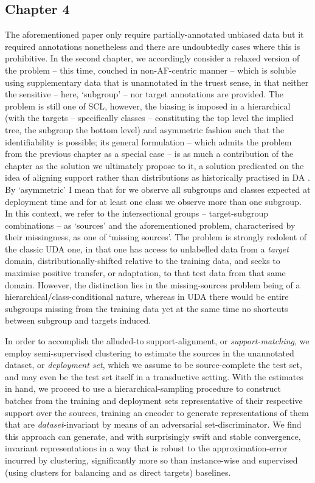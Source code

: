 \subsection*{Chapter 4}%
%
The aforementioned paper only require partially-annotated unbiased data but it required annotations
nonetheless and there are undoubtedly cases where this is prohibitive.
%
In the second chapter, we accordingly consider a relaxed version of the problem -- this time,
couched in non-\ac{AF}-centric manner -- which is soluble using supplementary data that is unannotated
in the truest sense, in that neither the sensitive -- here, `subgroup' -- nor target annotations
are provided.
%
The problem is still one of \ac{SCL}, however, the biasing is imposed in a hierarchical (with the
targets -- specifically classes -- constituting the top level the implied tree, the subgroup the
bottom level) and asymmetric fashion such that the identifiability is possible; its general
formulation -- which admits the problem from the previous chapter as a special case -- is as much a
contribution of the chapter as the solution we ultimately propose to it, a solution predicated on
the idea of aligning support rather than distributions as historically practised in \acs{DA}
\citep{ben2006analysis}.
%
By `asymmetric' I mean that for we observe all subgroups and classes expected at deployment time
and for at least one class we observe more than one subgroup. 
%
In this context, we refer to the intersectional groups -- target-subgroup combinations -- as
`sources' and the aforementioned problem, characterised by their missingness, as one of `missing
sources'.
%
The problem is strongly redolent of the classic \acf{UDA} one, in that one has access to unlabelled
data from a \emph{target} domain, distributionally-shifted relative to the training data, and seeks
to maximise positive transfer, or adaptation, to that test data from that same domain.
%
However, the distinction lies in the missing-sources problem being of a
hierarchical/class-conditional nature, whereas in \ac{UDA} there would be entire subgroups missing
from the training data yet at the same time no shortcuts between subgroup and targets induced.

%
In order to accomplish the alluded-to support-alignment, or \emph{support-matching}, we employ
semi-supervised clustering to estimate the sources in the unannotated dataset, or \emph{deployment
set}, which we assume to be source-complete \wrt{} the test set, and may even be the test set
itself in a transductive setting.
%
With the estimates in hand, we proceed to use a hierarchical-sampling procedure to construct
batches from the training and deployment sets representative of their respective support over the
sources, training an encoder to generate representations of them that are \emph{dataset}-invariant
by means of an adversarial set-discriminator.
%
We find this approach can generate, and with surprisingly swift and stable convergence, invariant
representations in a way that is robust to the approximation-error incurred by clustering,
significantly more so than instance-wise and supervised (using clusters for balancing and as direct
targets) baselines.
%
